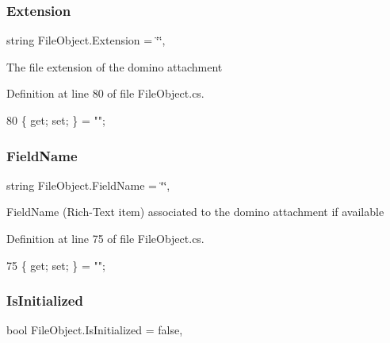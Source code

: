 \subsubsection{\texorpdfstring{Extension}{Extension}}
{\footnotesize\ttfamily string File\+Object.\+Extension = \char`\"{}\char`\"{}\hspace{0.3cm}{\ttfamily [get]}, {\ttfamily [set]}}



The file extension of the domino attachment 



Definition at line 80 of file File\+Object.\+cs.


\begin{DoxyCode}
80 \{ \textcolor{keyword}{get}; \textcolor{keyword}{set}; \} = \textcolor{stringliteral}{""};
\end{DoxyCode}
\mbox{\label{class_file_object_a26fa0ac628fee2387b7f89c78f93842e}} 
\subsubsection{\texorpdfstring{Field\+Name}{FieldName}}
{\footnotesize\ttfamily string File\+Object.\+Field\+Name = \char`\"{}\char`\"{}\hspace{0.3cm}{\ttfamily [get]}, {\ttfamily [set]}}



Field\+Name (Rich-\/\+Text item) associated to the domino attachment if available 



Definition at line 75 of file File\+Object.\+cs.


\begin{DoxyCode}
75 \{ \textcolor{keyword}{get}; \textcolor{keyword}{set}; \} = \textcolor{stringliteral}{""};
\end{DoxyCode}
\mbox{\label{class_file_object_a36ff6c07d0662885402bfe7d98cf2988}} 
\subsubsection{\texorpdfstring{Is\+Initialized}{IsInitialized}}
{\footnotesize\ttfamily bool File\+Object.\+Is\+Initialized = false\hspace{0.3cm}{\ttfamily [get]}, {\ttfamily [set]}}




